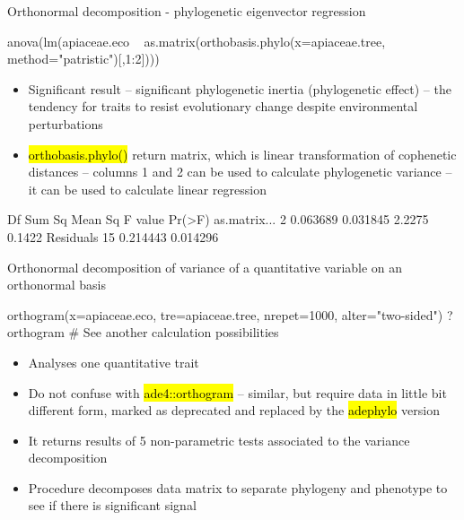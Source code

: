 \documentclass[compress, ucs, xelatex, 11pt, xcolor=svgnames,
  hyperref={
    bookmarks=true,
    unicode=true,
    colorlinks=true,
    pdftitle={Molecular data in R},
    plainpages=false,
    pdfauthor={Vojtech Zeisek},
    pdfsubject={Course about phylogeny and evolution in R},
    pdfcreator={XeLaTeX},
    pdfkeywords={R, evolution, phylogeny, molecular data},
    linkcolor=Tomato,
    anchorcolor=SaddleBrown,
    citecolor=Goldenrod,
    filecolor=DarkMagenta,
    menucolor=Sienna,
    urlcolor=DarkTurquoise,
    pdftex},
  url={hyphens, lowtilde} %
  ]{beamer}
\renewcommand{\texttt}[1]{\hl{\ttfamily #1}}
\begin{document}
\begin{frame}[fragile]{Orthonormal decomposition - phylogenetic eigenvector regression}
  \begin{spluscode}
    anova(lm(apiaceae.eco ~ as.matrix(orthobasis.phylo(x=apiaceae.tree,
      method="patristic")[,1:2])))
  \end{spluscode}
  \begin{itemize}
    \item Significant result -- significant phylogenetic inertia (phylogenetic effect) -- the tendency for traits to resist evolutionary change despite environmental perturbations
    \item \texttt{orthobasis.phylo()} return matrix, which is linear transformation of cophenetic distances -- columns 1 and 2 can be used to calculate phylogenetic variance -- it can be used to calculate linear regression
  \end{itemize}
  \begin{spluscode}
                 Df   Sum Sq  Mean Sq F value Pr(>F)
    as.matrix...  2 0.063689 0.031845  2.2275 0.1422
    Residuals    15 0.214443 0.014296
  \end{spluscode}
\end{frame}

\begin{frame}[fragile]{Orthonormal decomposition of variance of a quantitative variable on an orthonormal basis}
  \begin{spluscode}
    orthogram(x=apiaceae.eco, tre=apiaceae.tree, nrepet=1000,
      alter="two-sided")
    ?orthogram # See another calculation possibilities
  \end{spluscode}
  \begin{itemize}
    \item Analyses one quantitative trait
    \item Do not confuse with \texttt{ade4::orthogram} -- similar, but require data in little bit different form, marked as deprecated and replaced by the \texttt{adephylo} version
    \item It returns results of 5 non-parametric tests associated to the variance decomposition
    \item Procedure decomposes data matrix to separate phylogeny and phenotype to see if there is significant signal
  \end{itemize}
\end{frame}
\end{document}
